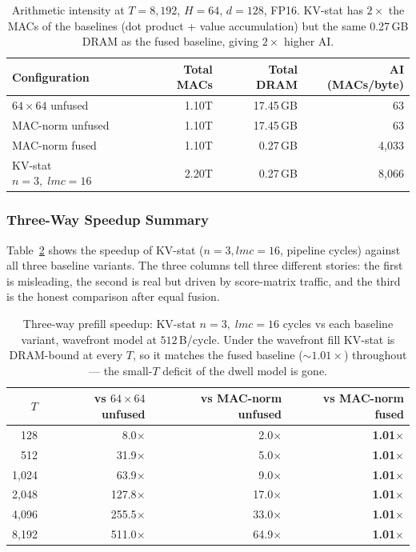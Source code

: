 \documentclass[11pt]{article}
\begin{document}
\begin{table}[H]
\centering
\caption{Arithmetic intensity at \(T = 8{,}192\), \(H=64\), \(d=128\), FP16.
KV-stat has \(2\times\) the MACs of the baselines (dot product + value accumulation)
but the same 0.27\,GB DRAM as the fused baseline, giving \(2\times\) higher AI.}
\label{tab:ai_comparison}
\begin{tabular}{lrrr}
\toprule
Configuration & Total MACs & Total DRAM & AI (MACs/byte) \\
\midrule
\(64 \times 64\) unfused    & 1.10T & 17.45\,GB & 63 \\
MAC-norm unfused            & 1.10T & 17.45\,GB & 63 \\
MAC-norm fused              & 1.10T &  0.27\,GB & 4,033 \\
KV-stat \(n=3,\;lmc=16\)   & 2.20T &  0.27\,GB & 8,066 \\
\bottomrule
\end{tabular}
\end{table}

\subsubsection*{Three-Way Speedup Summary}

Table~\ref{tab:speedup_3way} shows the speedup of KV-stat
(\(n=3, lmc=16\), pipeline cycles) against all three baseline
variants.
The three columns tell three different stories:
the first is misleading, the second is real but driven by
score-matrix traffic, and the third is the honest comparison
after equal fusion.

\begin{table}[H]
\centering
\caption{Three-way prefill speedup: KV-stat \(n=3,\;lmc=16\)
cycles vs each baseline variant, wavefront model at \(512\,\)B/cycle.
Under the wavefront fill KV-stat is DRAM-bound at every \(T\), so it
matches the fused baseline (\(\sim\!1.01\times\)) throughout --- the
small-\(T\) deficit of the dwell model is gone.}
\label{tab:speedup_3way}
\begin{tabular}{rrrr}
\toprule
\(T\) & vs \(64{\times}64\) unfused & vs MAC-norm unfused & vs MAC-norm fused \\
\midrule
128   &   8.0$\times$ &  2.0$\times$ & \textbf{1.01$\times$} \\
512   &  31.9$\times$ &  5.0$\times$ & \textbf{1.01$\times$} \\
1,024 &  63.9$\times$ &  9.0$\times$ & \textbf{1.01$\times$} \\
2,048 & 127.8$\times$ & 17.0$\times$ & \textbf{1.01$\times$} \\
4,096 & 255.5$\times$ & 33.0$\times$ & \textbf{1.01$\times$} \\
8,192 & 511.0$\times$ & 64.9$\times$ & \textbf{1.01$\times$} \\
\bottomrule
\end{tabular}
\end{table}
\end{document}
